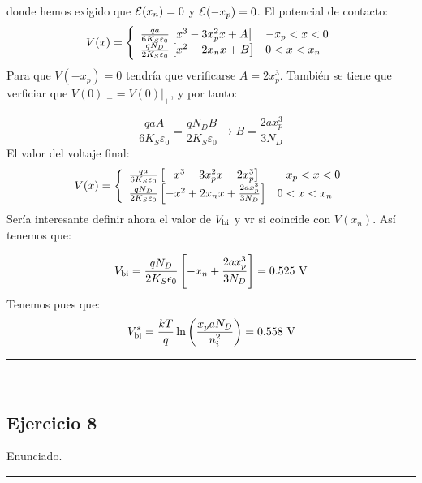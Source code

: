 donde hemos exigido que $\mathcal{E}(x_n)=0$ y $\mathcal{E}(-x_p)=0$. El potencial de contacto:
\begin{equation*}
    V (x) =  \left\lbrace \begin{array}{ll}
        \frac{qa}{6K_S\varepsilon_0} \left[ x^3 - 3x_p^2 x + A \right] & -x_p < x < 0  \\ 
        \frac{qN_D}{2K_S\varepsilon_0} \left[ x^2 - 2x_n x + B \right] & 0 < x < x_n  
    \end{array} \right.
\end{equation*} 
Para que $V(-x_p)=0$ tendría que verificarse $A=2x_p^3$. También se tiene que verficiar que $V(0)|_{-}=V(0)|_{+}$, y por tanto: 

\begin{equation*}
    \frac{qa A}{6K_S\varepsilon_0} = \frac{qN_D B}{2K_S\varepsilon_0} \rightarrow B = \frac{2 a x_p^3}{3 N_D}
\end{equation*}
El valor del voltaje final: 
\begin{equation*}
    V (x) =  \left\lbrace \begin{array}{ll}
        \frac{qa}{6K_S\varepsilon_0} \left[ -x^3 + 3x_p^2 x + 2x_p^3 \right] & -x_p < x < 0  \\ 
        \frac{qN_D}{2K_S\varepsilon_0} \left[ -x^2 + 2x_n x + \frac{2 a x_p^3}{3 N_D} \right] & 0 < x < x_n  
    \end{array} \right.
\end{equation*}
Sería interesante definir ahora el valor de $V_{\text{bi}}$ y vr si coincide con $V(x_n)$. Así tenemos que:

\begin{equation}
    \Vbi = \frac{qN_D}{2K_S\epsilon_0} \ccorchetes{-x_n+\frac{2ax_p^3}{3N_D}} = 0.525 \ \unit{V}
\end{equation}
Tenemos pues que: 
\begin{equation}
    \Vbi^* = \frac{kT}{q} \ln \parentesis{\frac{x_p a N_D}{n_i^2}} = 0.558 \ \unit{V}
\end{equation}


\rule{\textwidth}{0.1pt} \\[2pt]


\subsection{Ejercicio 8} 

Enunciado.

\rule{\textwidth}{0.1pt} \\[2pt]

